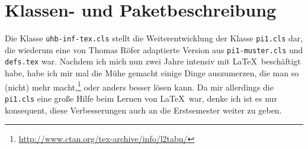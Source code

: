 \documentclass[nicefonts,nogruppe,nosemester,noveranstaltung,notutor,noabgabe,utf]{uhb-inf-tex}
\begin{document}
\begin{figure}
	\setlength\fboxsep{0pt}
	\setlength\fboxrule{.01667em}
\end{figure}

\section{Klassen- und Paketbeschreibung}

Die Klasse \texttt{uhb-inf-tex.cls} stellt die Weiterentwicklung der Klasse \texttt{pi1.cls} dar, die wiederum eine von Thomas Röfer adaptierte Version aus \texttt{pi1-muster.cls} und \texttt{defs.tex} war. Nachdem ich mich nun zwei Jahre intensiv mit \LaTeX\ beschäftigt habe, habe ich mir mal die Mühe gemacht einige Dinge auszumerzen, die man so (nicht) mehr macht,\footnote{\url{http://www.ctan.org/tex-archive/info/l2tabu/}} oder anders besser lösen kann. Da mir allerdings die \texttt{pi1.cls} eine große Hilfe beim Lernen von \LaTeX\ war, denke ich ist es nur konsequent, diese Verbesserungen auch an die Erstsemester weiter zu geben.
\end{document}
